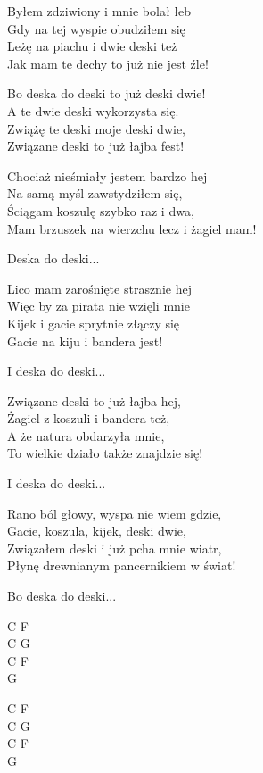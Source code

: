 \begin{text}
    Byłem zdziwiony i mnie bolał łeb\\
    Gdy na tej wyspie obudziłem się\\
    Leżę na piachu i dwie deski też\\
    Jak mam te dechy to już nie jest źle!

    \vin Bo deska do deski to już deski dwie!\\
    \vin A te dwie deski wykorzysta się.\\
    \vin Zwiążę te deski moje deski dwie,\\
    \vin Związane deski to już łajba fest!

    Chociaż nieśmiały jestem bardzo hej\\
    Na samą myśl zawstydziłem się,\\
    Ściągam koszulę szybko raz i dwa,\\
    Mam brzuszek na wierzchu lecz i żagiel mam!

    \vin Deska do deski...

    Lico mam zarośnięte strasznie hej\\
    Więc by za pirata nie wzięli mnie\\
    Kijek i gacie sprytnie złączy się\\
    Gacie na kiju i bandera jest!

    \vin I deska do deski...

    Związane deski to już łajba hej,\\
    Żagiel z koszuli i bandera też,\\
    A że natura obdarzyła mnie,\\
    To wielkie działo także znajdzie się!

    \vin I deska do deski...

    Rano ból głowy, wyspa nie wiem gdzie,\\
    Gacie, koszula, kijek, deski dwie,\\
    Związałem deski i już pcha mnie wiatr,\\
    Płynę drewnianym pancernikiem w świat!

    \vin Bo deska do deski...

\end{text}
\begin{chord}
    C F\\
    C G\\
    C F\\
    G

    C F\\
    C G\\
    C F\\
    G

\end{chord}